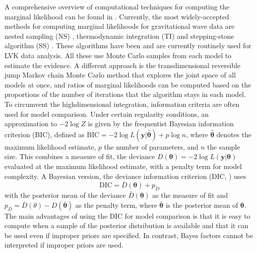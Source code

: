 \documentclass[%
 reprint,
 amsmath,amssymb,
 aps,
]{revtex4-2}
\def\btheta{\boldsymbol{\theta}}
\def\ybold{\mathbf{y}}
\begin{document}
A comprehensive overview of computational techniques for computing the marginal likelihood can be found in 
\cite{RobertCP2009CmfB, GelmanAndrew2014, ChristensenNelson2022Pewg}.
Currently, the most widely-accepted methods for computing marginal likelihoods for gravitational wave data are nested sampling (NS) \cite{skilling2006nested, veitch2010bayesian}, thermodynamic integration (TI) \cite{gelman1998simulating, lartillot2006computing} and stepping-stone algorithm (SS) \cite{xie2011improving, maturana2019stepping}. These algorithms have been and are currently routinely used for LVK data analysis. All these use Monte Carlo samples from each model to estimate the evidence. A different approach is the transdimensional reversible jump Markov chain Monte Carlo method \cite{green1995reversible, umstatter2005bayesian} that explores the joint space of all models at once, and ratios of marginal likelihoods can be computed based on the proportions of the number of iterations that the algorithm stays in each model. 
To circumvent the highdimensional integration, information criteria are often used for model comparison.
Under certain regularity conditions, an approximation to $-2\log Z$ is given by the frequentist Bayesian information criterion (BIC), defined as $\mbox{BIC}=-2\log L(\ybold|\hat{\btheta}) +p\log n$,
where $\hat{\btheta}$ denotes the maximum likelihood estimate, $p$ the number of parameters, and $n$ the sample size. This combines a measure of fit, the deviance $D(\btheta)= -2\log L(\ybold|\btheta)$ evaluated at the maximum likelihood estimate, with a penalty term for model complexity. A Bayesian version, the deviance information criterion (DIC, \cite{spiegelhalter2002bayesian}) uses 
\[\mbox{DIC}=\bar{D}(\btheta) +p_D \]
with the posterior mean of the deviance $\bar{D}(\btheta)$  as the measure of fit and $p_D=\bar{D}(\theta)-D(\bar{\btheta})$ as the penalty term, where $\bar{\btheta}$ is the posterior mean of $\btheta$. The main advantages of using the DIC for model comparison is that it is easy to compute when a sample of the posterior distribution is available and that it can be used even if improper priors are specified. In contrast, Bayes factors cannot be interpreted if improper priors are used.
\end{document}
